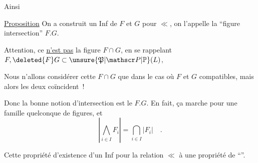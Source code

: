 
Ainsi

\uline{Proposition} On a construit un Inf de $F$ et $G$ pour $\ll$, on l'appelle la ``figure intersection'' $F.G$.

Attention, ce \uline{n'est pas}  la figure $F\cap G$,  en se rappelant $F,\deleted{F}G\subset\unsure{\mathfrak P|\mathscr P|\mathbb P}(L)$, 

Nous n'allons considérer cette $F\cap G$ que dans le cas où $F$ et $G$ compatibles, mais alors les deux coïncident~!

Donc la bonne notion d'intersection est le $F.G$. En fait, ça marche pour une famille quelconque de figures, et
\[
 \left|\bigwedge_{i\in I} F_i\right|=\bigcap_{i\in I}|F_i|\quad .
\]

Cette propriété d'existence d'un Inf pour la relation $\ll$   à une propriété de ``\uline{}''.

